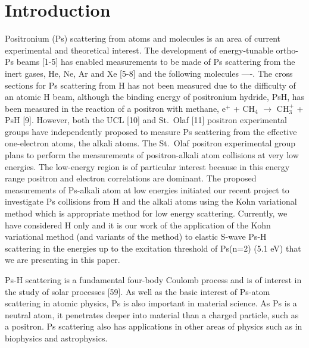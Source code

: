 \documentclass[preprint,showpacs,preprintnumbers,amsmath,amssymb]{revtex4}
\begin{document}
\section{Introduction}


Positronium (Ps) scattering from atoms and molecules
is an area of current experimental and theoretical interest.
The development of energy-tunable ortho-Ps beams [1-5] has enabled measurements
to be made of Ps scattering from the inert gases, He, Ne, Ar and Xe [5-8] and the
following molecules ----.
The cross sections for Ps scattering from H
has not been measured due to the difficulty
of an atomic H beam, although 
the binding energy of positronium hydride, PsH, has been measured
in the reaction of a positron with methane,
e$^+$ + CH$_4$ $\to$ CH$_3^+$ + PsH [9].
However,
both the UCL [10] and St.~Olaf [11] positron experimental 
groups  have independently proposed to measure  Ps scattering from the effective one-electron atoms,
the alkali atoms.
The St.~Olaf positron experimental group  plans to perform the measurements of positron-alkali atom
collisions at very low energies.
The low-energy region is of particular interest
because in this energy range positron and electron correlations are dominant.
The proposed measurements of Ps-alkali atom at low energies initiated
our recent project to investigate Ps collisions from
H and the alkali atoms using the
Kohn variational method which is appropriate
method for low energy scattering.
Currently, we have considered H only and it is our work
of the application of the Kohn variational method
(and variants of the method) to elastic S-wave Ps-H scattering 
in the energies up to the excitation threshold
of Ps(n=2) (5.1 eV) that we are presenting in this paper.


Ps-H scattering is a fundamental four-body Coulomb process
and is of interest in the study of solar processes [59].
As well as the basic interest of Ps-atom scattering in atomic physics,
Ps is also important in material science.
As Ps is a neutral atom, it penetrates deeper into material than a charged particle,
such as a positron.
Ps scattering also has applications
in other areas of physics such as in biophysics and astrophysics.
\end{document}
